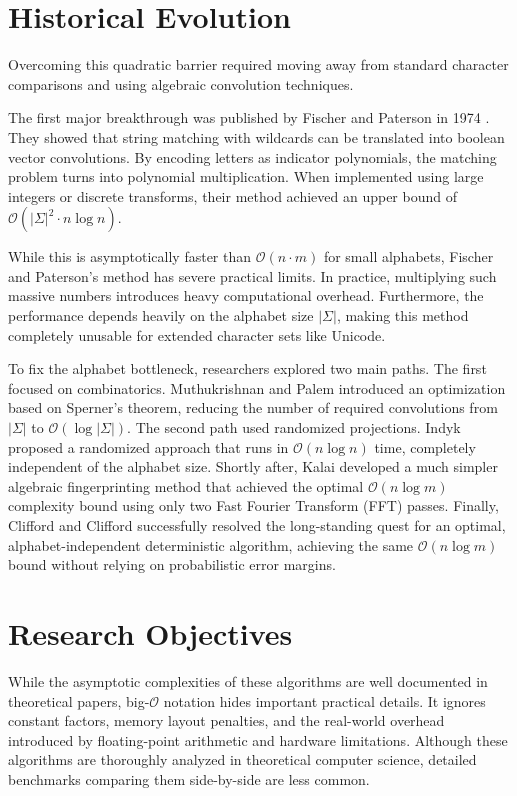 \section{Historical Evolution}
Overcoming this quadratic barrier required moving away from standard character comparisons and using algebraic convolution techniques.

The first major breakthrough was published by Fischer and Paterson in 1974 \cite{fp1974}. They showed that string matching with wildcards can be translated into boolean vector convolutions. By encoding letters as indicator polynomials, the matching problem turns into polynomial multiplication. When implemented using large integers or discrete transforms, their method achieved an upper bound of $\mathcal{O}(|\Sigma|^2 \cdot n \log n)$. 

While this is asymptotically faster than $\mathcal{O}(n \cdot m)$ for small alphabets, Fischer and Paterson's method has severe practical limits. In practice, multiplying such massive numbers introduces heavy computational overhead. Furthermore, the performance depends heavily on the alphabet size $|\Sigma|$, making this method completely unusable for extended character sets like Unicode.

To fix the alphabet bottleneck, researchers explored two main paths. The first focused on combinatorics. Muthukrishnan and Palem \cite{mp1994} introduced an optimization based on Sperner's theorem, reducing the number of required convolutions from $|\Sigma|$ to $\mathcal{O}(\log |\Sigma|)$. The second path used randomized projections. Indyk \cite{indyk1998} proposed a randomized approach that runs in $\mathcal{O}(n \log n)$ time, completely independent of the alphabet size. Shortly after, Kalai \cite{kalai2002} developed a much simpler algebraic fingerprinting method that achieved the optimal $\mathcal{O}(n \log m)$ complexity bound using only two Fast Fourier Transform (FFT) passes. Finally, Clifford and Clifford \cite{clifford2007} successfully resolved the long-standing quest for an optimal, alphabet-independent deterministic algorithm, achieving the same $\mathcal{O}(n \log m)$ bound without relying on probabilistic error margins.

\section{Research Objectives}
While the asymptotic complexities of these algorithms are well documented in theoretical papers, big-$\mathcal{O}$ notation hides important practical details. It ignores constant factors, memory layout penalties, and the real-world overhead introduced by floating-point arithmetic and hardware limitations. Although these algorithms are thoroughly analyzed in theoretical computer science, detailed benchmarks comparing them side-by-side are less common.

